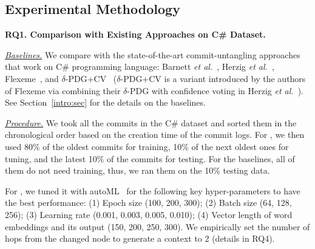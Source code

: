

\subsection{Experimental Methodology}
\label{method:sec}

\noindent\textbf{RQ1. Comparison with Existing Approaches on C\# Dataset.}

{\em \underline{Baselines.}} We compare {\tool} with the
state-of-the-art commit-untangling approaches that work on C\#
programming language: Barnett {\em et al.}~\cite{barnett-icse15},
Herzig {\em et al.}~\cite{kim-emse16}, Flexeme~\cite{flexeme-fse20},
and $\delta$-PDG+CV~\cite{flexeme-fse20} ($\delta$-PDG+CV is a variant
introduced by the authors of Flexeme via combining their $\delta$-PDG
with confidence voting in Herzig {\em et al.}~\cite{kim-emse16}). See
Section~\ref{intro:sec} for the details on the baselines.


\textit{\underline{Procedure.}}
We took all the commits in the C\# dataset and sorted them in the
chronological order based on the creation time of the commit logs. For
{\tool}, we then used 80\% of the oldest commits for training, 10\% of
the next oldest ones for tuning, and the latest 10\% of the commits
for testing. For the baselines, all of them do not need training,
thus, we ran them on the 10\% testing data.

For {\tool}, we tuned it with autoML~\cite{NNI} for the following
key hyper-parameters to have the best performance: (1) Epoch size
(100, 200, 300); (2) Batch size (64, 128, 256); (3) Learning rate
(0.001, 0.003, 0.005, 0.010); (4) Vector length of word embeddings and
its output (150, 200, 250, 300). We empirically set the number of hops from the changed node to generate a context to 2 (details in RQ4).

